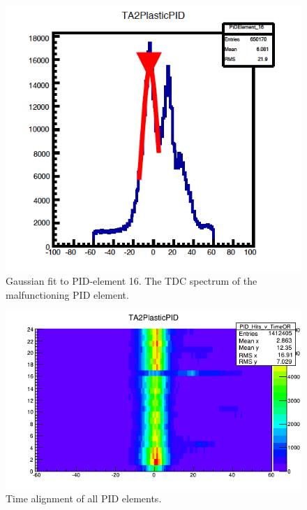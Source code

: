 \begin{figure}[H]
\begin{center}
\includegraphics[scale=0.4]{pictures/png/pidtdcgaus16.png}
\caption{Gaussian fit to PID-element 16. The TDC spectrum of the malfunctioning PID element.}
\label{pidtdcgaus16}
\end{center}
\end{figure}

\begin{figure}[H]
\begin{center}
\includegraphics[scale=0.55]{pictures/png/pidtdcoffset.png}
\caption{Time alignment of all PID elements.}
\label{pidtdcoffset}
\end{center}
\end{figure}


